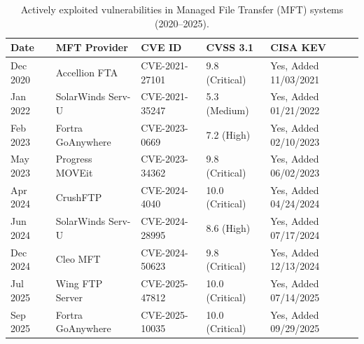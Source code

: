 \documentclass{article}
\begin{document}
\begin{table}[htbp]
    \centering
    \renewcommand{\arraystretch}{1.2}
    \setlength{\tabcolsep}{8pt}
    \caption{Actively exploited vulnerabilities in Managed File Transfer (MFT) systems (2020--2025).}
    \label{tab:mft_hacks}
    \begin{tabular}{lllll} 
        \toprule
        \textbf{Date} & \textbf{MFT Provider} & \textbf{CVE ID} & \textbf{CVSS 3.1} & \textbf{CISA KEV} \\
        \midrule
        Dec 2020 & Accellion FTA & CVE-2021-27101 & 9.8 (Critical) & Yes, Added 11/03/2021 \\
        Jan 2022 & SolarWinds Serv-U & CVE-2021-35247 & 5.3 (Medium) & Yes, Added 01/21/2022 \\
        Feb 2023 & Fortra GoAnywhere & CVE-2023-0669 & 7.2 (High) & Yes, Added 02/10/2023 \\
        May 2023 & Progress MOVEit & CVE-2023-34362 & 9.8 (Critical) & Yes, Added 06/02/2023 \\
        Apr 2024 & CrushFTP & CVE-2024-4040 & 10.0 (Critical) & Yes, Added 04/24/2024 \\
        Jun 2024 & SolarWinds Serv-U & CVE-2024-28995 & 8.6 (High) & Yes, Added 07/17/2024 \\
        Dec 2024 & Cleo MFT & CVE-2024-50623 & 9.8 (Critical) & Yes, Added 12/13/2024 \\
        Jul 2025 & Wing FTP Server & CVE-2025-47812 & 10.0 (Critical) & Yes, Added 07/14/2025 \\
        Sep 2025 & Fortra GoAnywhere & CVE-2025-10035 & 10.0 (Critical) & Yes, Added 09/29/2025 \\
        \bottomrule
    \end{tabular}
\end{table}
\end{document}
